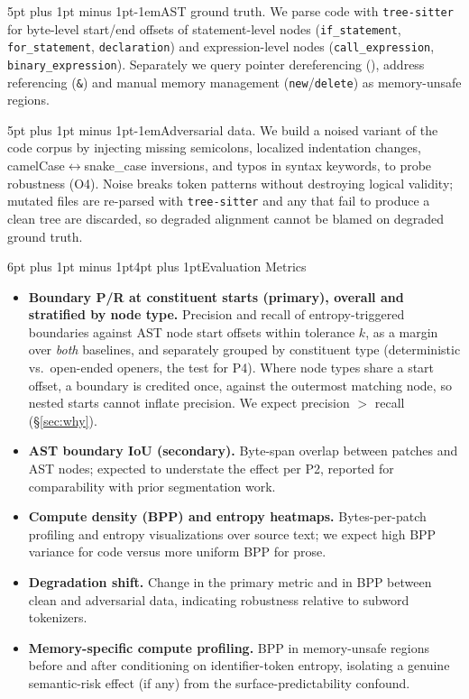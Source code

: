 \documentclass[10pt]{article}
\makeatletter
\renewcommand\section{\@startsection{section}{1}{0pt}%
  {6pt plus 1pt minus 1pt}{4pt plus 1pt}{\normalfont\large\bfseries}}
\renewcommand\paragraph{\@startsection{paragraph}{4}{0pt}%
  {5pt plus 1pt minus 1pt}{-1em}{\normalfont\normalsize\bfseries}}
\newcommand{\code}[1]{\texttt{\small #1}}
\makeatother
\begin{document}
\paragraph{AST ground truth.} We parse code with \code{tree-sitter} for byte-level
start/end offsets of statement-level nodes (\code{if\_statement},
\code{for\_statement}, \code{declaration}) and expression-level nodes
(\code{call\_expression}, \code{binary\_expression}). Separately we query pointer
dereferencing (\code{*}), address referencing (\code{\&}) and manual memory
management (\code{new}/\code{delete}) as memory-unsafe regions.

\paragraph{Adversarial data.} We build a noised variant of the code corpus by
injecting missing semicolons, localized indentation changes,
camelCase$\leftrightarrow$snake\_case inversions, and typos in syntax keywords, to
probe robustness (O4). Noise breaks token patterns without destroying logical
validity; mutated files are re-parsed with \code{tree-sitter} and any that fail
to produce a clean tree are discarded, so degraded alignment cannot be blamed
on degraded ground truth.

\section{Evaluation Metrics}
\label{sec:metrics}

\begin{itemize}
\item \textbf{Boundary P/R at constituent starts (primary), overall and
stratified by node type.} Precision and recall of entropy-triggered boundaries
against AST node start offsets within tolerance $k$, as a margin over
\emph{both} baselines, and separately grouped by constituent type
(deterministic vs.\ open-ended openers, the test for P4). Where node types
share a start offset, a boundary is credited once, against the outermost
matching node, so nested starts cannot inflate precision. We expect
precision $>$ recall (\S\ref{sec:why}).
\item \textbf{AST boundary IoU (secondary).} Byte-span overlap between patches and
AST nodes; expected to understate the effect per P2, reported for comparability
with prior segmentation work.
\item \textbf{Compute density (BPP) and entropy heatmaps.} Bytes-per-patch
profiling and entropy visualizations over source text; we expect high BPP variance
for code versus more uniform BPP for prose.
\item \textbf{Degradation shift.} Change in the primary metric and in BPP between
clean and adversarial data, indicating robustness relative to subword tokenizers.
\item \textbf{Memory-specific compute profiling.} BPP in memory-unsafe regions
before and after conditioning on identifier-token entropy, isolating a genuine
semantic-risk effect (if any) from the surface-predictability confound.
\end{itemize}
\end{document}
